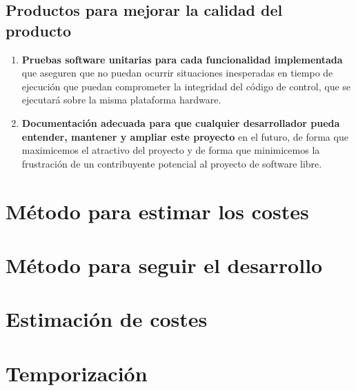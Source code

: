 \subsection{Productos para mejorar la calidad del producto}

\begin{enumerate}
    \item \textbf{Pruebas software unitarias para cada funcionalidad implementada} que aseguren que no
    puedan ocurrir situaciones inesperadas en tiempo
    de ejecución que puedan comprometer la integridad del código de control, que se ejecutará sobre
    la misma plataforma hardware.
    \item \textbf{Documentación adecuada para que cualquier desarrollador pueda entender,
    mantener y ampliar este proyecto} en el futuro, de forma que maximicemos el atractivo
    del proyecto y de forma que minimicemos la frustración de un contribuyente potencial
    al proyecto de software libre.
\end{enumerate}

\section{Método para estimar los costes}



\section{Método para seguir el desarrollo}


\section{Estimación de costes}

\section{Temporización}

